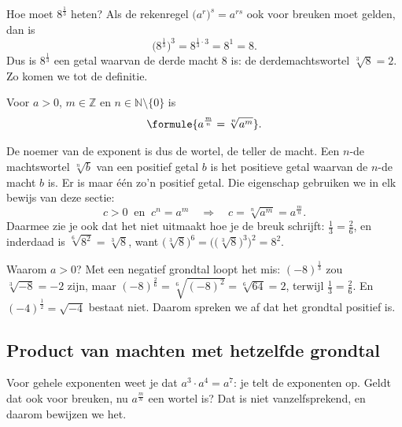 Hoe moet $8^{\frac13}$ heten? Als de rekenregel $\bigl(a^r\bigr)^s = a^{rs}$ ook voor breuken moet gelden, dan is
\[\bigl(8^{\frac13}\bigr)^3 = 8^{\frac13 \cdot 3} = 8^1 = 8 .\]
Dus is $8^{\frac13}$ een getal waarvan de derde macht $8$ is: de derdemachtswortel $\sqrt[3]{8} = 2$. Zo komen we tot de definitie.

\begin{theorie}
Voor $a > 0$, $m \in \mathbb{Z}$ en $n \in \mathbb{N} \setminus \{0\}$ is
\[\formule{a^{\frac{m}{n}} = \sqrt[n]{a^m}}.\]
\end{theorie}

De noemer van de exponent is dus de wortel, de teller de macht. Een $n$-de machtswortel $\sqrt[n]{b}$ van een positief getal $b$ is het positieve getal waarvan de $n$-de macht $b$ is. Er is maar één zo'n positief getal. Die eigenschap gebruiken we in elk bewijs van deze sectie:
\[c > 0 \ \text{ en } \ c^n = a^m \quad \Longrightarrow \quad c = \sqrt[n]{a^m} = a^{\frac{m}{n}} .\]
Daarmee zie je ook dat het niet uitmaakt hoe je de breuk schrijft: $\frac13 = \frac26$, en inderdaad is $\sqrt[6]{8^2} = \sqrt[3]{8}$, want $\bigl(\sqrt[3]{8}\bigr)^6 = \bigl(\bigl(\sqrt[3]{8}\bigr)^3\bigr)^2 = 8^2$.

Waarom $a > 0$? Met een negatief grondtal loopt het mis: $(-8)^{\frac13}$ zou $\sqrt[3]{-8} = -2$ zijn, maar $(-8)^{\frac26} = \sqrt[6]{(-8)^2} = \sqrt[6]{64} = 2$, terwijl $\frac13 = \frac26$. En $(-4)^{\frac12} = \sqrt{-4}$ bestaat niet. Daarom spreken we af dat het grondtal positief is.


\begin{oefeningen}
\end{oefeningen}

\subsection{Product van machten met hetzelfde grondtal}

Voor gehele exponenten weet je dat $a^3 \cdot a^4 = a^7$: je telt de exponenten op. Geldt dat ook voor breuken, nu $a^{\frac{m}{n}}$ een wortel is? Dat is niet vanzelfsprekend, en daarom bewijzen we het.

